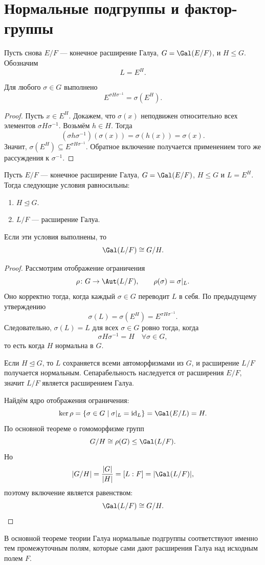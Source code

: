 \section{Нормальные подгруппы и фактор-группы}

Пусть снова $E/F$ --- конечное расширение Галуа, $G = \Gal(E/F)$, и $H \leq G$. Обозначим
\[
    L = E^H.
\]

\begin{stmt}
Для любого $\sigma \in G$ выполнено
\[
    E^{\sigma H \sigma^{-1}} = \sigma(E^H).
\]
\begin{proof}
Пусть $x \in E^H$. Докажем, что $\sigma(x)$ неподвижен относительно всех элементов $\sigma H \sigma^{-1}$.
Возьмём $h \in H$. Тогда
\[
    (\sigma h \sigma^{-1})(\sigma(x)) = \sigma(h(x)) = \sigma(x).
\]
Значит, $\sigma(E^H) \subseteq E^{\sigma H \sigma^{-1}}$. Обратное включение получается применением того же рассуждения к
$\sigma^{-1}$.
\end{proof}
\end{stmt}

\begin{theorem}
Пусть $E/F$ --- конечное расширение Галуа, $G = \Gal(E/F)$, $H \leq G$ и $L = E^H$. Тогда следующие условия равносильны:
\begin{enumerate}
    \item $H \trianglelefteq G$.
    \item $L/F$ --- расширение Галуа.
\end{enumerate}
Если эти условия выполнены, то
\[
    \Gal(L/F) \cong G/H.
\]
\begin{proof}
Рассмотрим отображение ограничения
\[
    \rho\colon G \to \Aut(L/F),
    \qquad
    \rho(\sigma) = \sigma|_L.
\]
Оно корректно тогда, когда каждый $\sigma \in G$ переводит $L$ в себя. По предыдущему утверждению
\[
    \sigma(L) = \sigma(E^H) = E^{\sigma H \sigma^{-1}}.
\]
Следовательно, $\sigma(L)=L$ для всех $\sigma \in G$ ровно тогда, когда
\[
    \sigma H \sigma^{-1}=H \quad \forall \sigma \in G,
\]
то есть когда $H$ нормальна в $G$.

Если $H \trianglelefteq G$, то $L$ сохраняется всеми автоморфизмами из $G$, и расширение $L/F$ получается нормальным.
Сепарабельность наследуется от расширения $E/F$, значит $L/F$ является расширением Галуа.


Найдём ядро отображения ограничения:
\[
    \ker \rho = \{\sigma \in G \mid \sigma|_L = \mathrm{id}_L\} = \Gal(E/L) = H.
\]
По основной теореме о гомоморфизме групп
\[
    G/H \cong \rho(G) \leq \Gal(L/F).
\]
Но
\[
    |G/H| = \frac{|G|}{|H|} = [L:F] = |\Gal(L/F)|,
\]
поэтому включение является равенством:
\[
    \Gal(L/F) \cong G/H.
\]
\end{proof}
\end{theorem}

\begin{remark}
В основной теореме теории Галуа нормальные подгруппы соответствуют именно тем промежуточным полям, которые сами дают расширения Галуа над исходным
полем $F$.

\end{remark}
